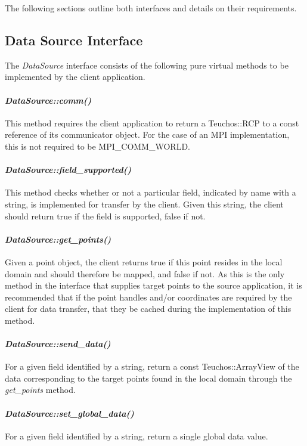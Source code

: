 \documentclass[letterpaper]{article}
\begin{document}
The following sections outline both interfaces and details on their
requirements. 

\subsection{Data Source Interface}
The {\sl DataSource} interface consists of the following pure
virtual methods to be implemented by the client application.

\paragraph{\sl DataSource::comm()}
This method requires the client application to return a Teuchos::RCP
to a const reference of its communicator object. For the case of an
MPI implementation, this is not required to be MPI\_COMM\_WORLD.

\paragraph{\sl DataSource::field\_supported()}
This method checks whether or not a particular field, indicated by
name with a string, is implemented for transfer by the client. Given
this string, the client should return true if the field is supported,
false if not.

\paragraph{\sl DataSource::get\_points()}
Given a point object, the client returns true if this point resides in
the local domain and should therefore be mapped, and false if not. As
this is the only method in the interface that supplies target points
to the source application, it is recommended that if the point handles
and/or coordinates are required by the client for data transfer, that
they be cached during the implementation of this method.

\paragraph{\sl DataSource::send\_data()}
For a given field identified by a string, return a const
Teuchos::ArrayView of the data corresponding to the target points
found in the local domain through the {\sl get\_points} method.

\paragraph{\sl DataSource::set\_global\_data()}
For a given field identified by a string, return a single global data
value.
\end{document}
